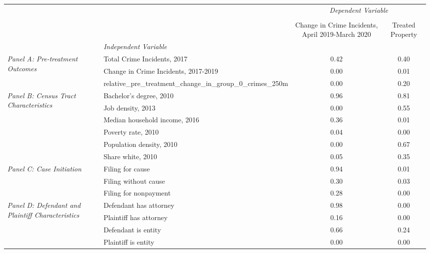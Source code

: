 \begin{tabular}{llcc}
\toprule
 &  & \multicolumn{2}{c}{\textit{Dependent Variable}} \\
\cline{3-4}
\\
 &  & Change in Crime Incidents, April 2019-March 2020 & Treated Property \\
 & \emph{Independent Variable} &  &  \\
\midrule
\multirow[c]{3}{3cm}{\textit{Panel A: Pre-treatment Outcomes}} & Total Crime Incidents, 2017 & 0.42 & 0.40 \\
 & Change in Crime Incidents, 2017-2019 & 0.00 & 0.01 \\
 & relative_pre_treatment_change_in_group_0_crimes_250m & 0.00 & 0.20 \\
\cline{1-4}
\multirow[c]{6}{3cm}{\textit{Panel B: Census Tract Characteristics}} & Bachelor's degree, 2010 & 0.96 & 0.81 \\
 & Job density, 2013 & 0.00 & 0.55 \\
 & Median household income, 2016 & 0.36 & 0.01 \\
 & Poverty rate, 2010 & 0.04 & 0.00 \\
 & Population density, 2010 & 0.00 & 0.67 \\
 & Share white, 2010 & 0.05 & 0.35 \\
\cline{1-4}
\multirow[c]{3}{3cm}{\textit{Panel C: Case Initiation}} & Filing for cause & 0.94 & 0.01 \\
 & Filing without cause & 0.30 & 0.03 \\
 & Filing for nonpayment & 0.28 & 0.00 \\
\cline{1-4}
\multirow[c]{4}{3cm}{\textit{Panel D: Defendant and Plaintiff Characteristics}} & Defendant has attorney & 0.98 & 0.00 \\
 & Plaintiff has attorney & 0.16 & 0.00 \\
 & Defendant is entity & 0.66 & 0.24 \\
 & Plaintiff is entity & 0.00 & 0.00 \\
\cline{1-4}
\bottomrule
\end{tabular}
